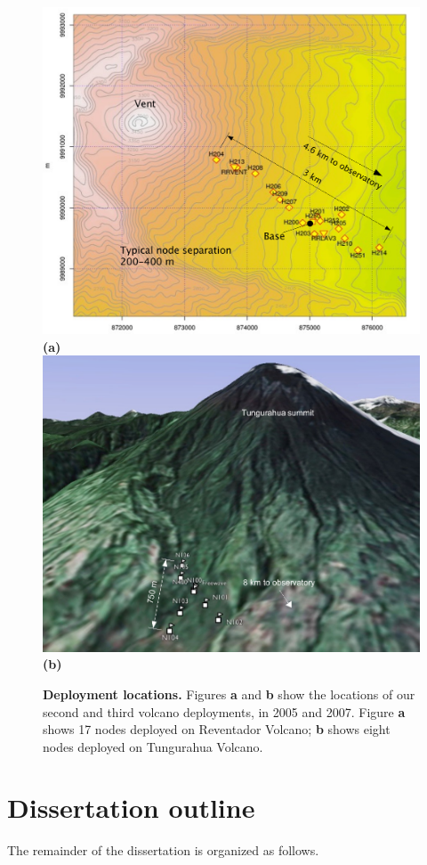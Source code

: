 \begin{figure}[]
\begin{center}
\includegraphics[width=1.0\hsize]{./evaluation/figs/pics/reventador-map.pdf}\\
\textbf{(a)}\\
\includegraphics[width=1.0\hsize]{./lance/figs/deploy/deployment-map.pdf}\\
\textbf{(b)}
\end{center}
\caption{{\bf Deployment locations.}
Figures \textbf{a} and \textbf{b} show the locations of our second and third volcano
deployments, in 2005 and 2007. Figure \textbf{a} shows 17 nodes deployed on Reventador
Volcano; \textbf{b} shows eight nodes deployed on Tungurahua Volcano.}
\label{fig-deployment-maps}
\end{figure}


\section{Dissertation outline}

The remainder of the dissertation is organized as follows.

